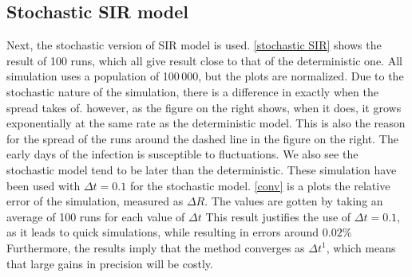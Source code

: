 \documentclass{article}
\begin{document}
    \subsection*{Stochastic SIR model}
    Next, the stochastic version of SIR model is used. \autoref{stochastic SIR} shows the result of 100 runs, which all give result close to that of the deterministic one. 
    All simulation uses a population of 100\,000, but the plots are normalized. 
    Due to the stochastic nature of the simulation, there is a difference in exactly when the spread takes of. 
    however, as the figure on the right shows, when it does, it grows exponentially at the same rate as the deterministic model. 
    This is also the reason for the spread of the runs around the dashed line in the figure on the right.
    The early days of the infection is susceptible to fluctuations.
    We also see the stochastic model tend to be later than the deterministic.
    These simulation have been used with $\Delta t = 0.1$ for the stochastic model. 
    \autoref{conv} is a plots the relative error of the simulation, measured as $\Delta R$.
    The values are gotten by taking an average of 100 runs for each value of $\Delta t$
    This result justifies the use of $\Delta t = 0.1$, as it leads to quick simulations, while resulting in errors around $0.02\%$
    Furthermore, the results imply that the method converges as $\Delta t^1$, which means that large gains in precision will be costly.
    
\end{document}
